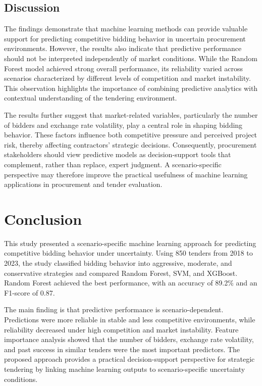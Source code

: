 \documentclass[twoside]{article}
\begin{document}
\subsection{Discussion}
The findings demonstrate that machine learning methods can provide valuable support for predicting competitive bidding behavior in uncertain procurement environments. However, the results also indicate that predictive performance should not be interpreted independently of market conditions. While the Random Forest model achieved strong overall performance, its reliability varied across scenarios characterized by different levels of competition and market instability. This observation highlights the importance of combining predictive analytics with contextual understanding of the tendering environment.

The results further suggest that market-related variables, particularly the number of bidders and exchange rate volatility, play a central role in shaping bidding behavior. These factors influence both competitive pressure and perceived project risk, thereby affecting contractors' strategic decisions. Consequently, procurement stakeholders should view predictive models as decision-support tools that complement, rather than replace, expert judgment. A scenario-specific perspective may therefore improve the practical usefulness of machine learning applications in procurement and tender evaluation.

\section{Conclusion}
This study presented a scenario-specific machine learning approach for predicting competitive bidding behavior under uncertainty. Using 850 tenders from 2018 to 2023, the study classified bidding behavior into aggressive, moderate, and conservative strategies and compared Random Forest, SVM, and XGBoost. Random Forest achieved the best performance, with an accuracy of 89.2\% and an F1-score of 0.87.

The main finding is that predictive performance is scenario-dependent. Predictions were more reliable in stable and less competitive environments, while reliability decreased under high competition and market instability. Feature importance analysis showed that the number of bidders, exchange rate volatility, and past success in similar tenders were the most important predictors. The proposed approach provides a practical decision-support perspective for strategic tendering by linking machine learning outputs to scenario-specific uncertainty conditions.
\end{document}
